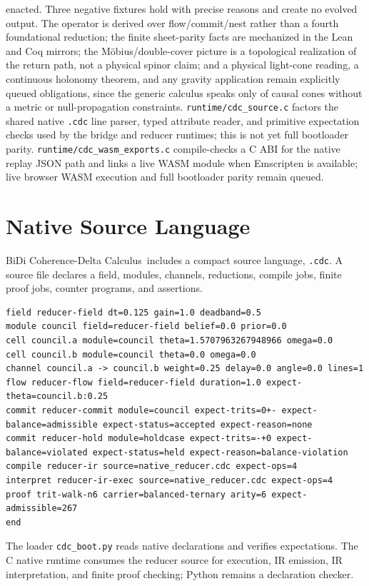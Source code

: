 \documentclass[11pt]{article}
\newcommand{\CDC}{BiDi Coherence-Delta Calculus}
\begin{document}
enacted. Three negative fixtures hold with precise reasons and create no
evolved output. The operator is derived over flow/commit/nest rather than a
fourth foundational reduction; the finite sheet-parity facts are mechanized in
the Lean and Coq mirrors; the M\"obius/double-cover picture is a topological
realization of the return path, not a physical spinor claim; and a physical
light-cone reading, a continuous holonomy theorem, and any gravity
application remain explicitly queued obligations, since the generic calculus
speaks only of causal cones without a metric or null-propagation constraints.
\texttt{runtime/cdc\_source.c} factors the shared native \texttt{.cdc}
line parser, typed attribute reader, and primitive expectation checks used by
the bridge and reducer runtimes; this is not yet full bootloader parity.
\texttt{runtime/cdc\_wasm\_exports.c} compile-checks a C ABI for the native
replay JSON path and links a live WASM module when Emscripten is available; live
browser WASM execution and full bootloader parity remain queued.

\section{Native Source Language}

\CDC\ includes a compact source language, \texttt{.cdc}. A source file declares a
field, modules, channels, reductions, compile jobs, finite proof jobs, counter
programs, and assertions.

\begin{lstlisting}[language={},caption={A small .cdc program.}]
field reducer-field dt=0.125 gain=1.0 deadband=0.5
module council field=reducer-field belief=0.0 prior=0.0
cell council.a module=council theta=1.5707963267948966 omega=0.0
cell council.b module=council theta=0.0 omega=0.0
channel council.a -> council.b weight=0.25 delay=0.0 angle=0.0 lines=1
flow reducer-flow field=reducer-field duration=1.0 expect-theta=council.b:0.25
commit reducer-commit module=council expect-trits=0+- expect-balance=admissible expect-status=accepted expect-reason=none
commit reducer-hold module=holdcase expect-trits=-+0 expect-balance=violated expect-status=held expect-reason=balance-violation
compile reducer-ir source=native_reducer.cdc expect-ops=4
interpret reducer-ir-exec source=native_reducer.cdc expect-ops=4
proof trit-walk-n6 carrier=balanced-ternary arity=6 expect-admissible=267
end
\end{lstlisting}

The loader \texttt{cdc\_boot.py} reads native declarations and verifies
expectations. The C native runtime consumes the reducer source for execution,
IR emission, IR interpretation, and finite proof checking; Python remains a
declaration checker.
\end{document}
